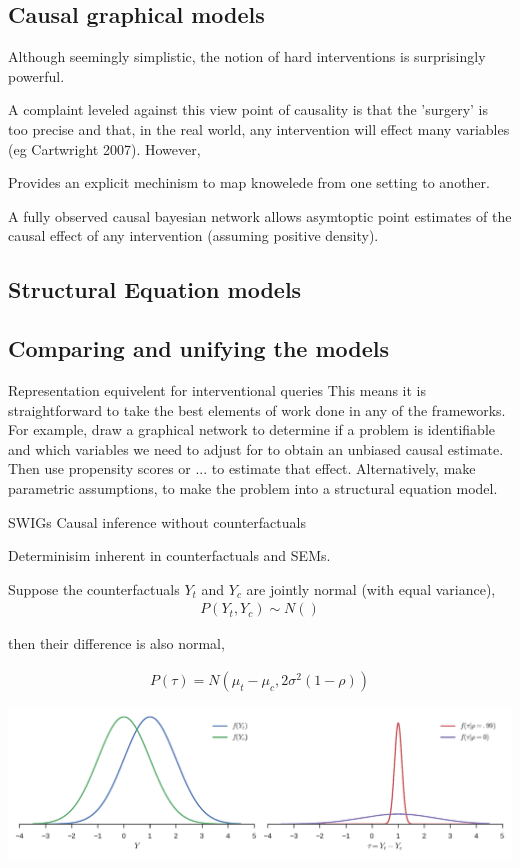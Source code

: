 \documentclass[11pt,a4paper,oneside]{book}
\newcommand{\eq}[1]{\begin{align*}#1\end{align*}}
\begin{document}
\subsection*{Causal graphical models}
Although seemingly simplistic, the notion of hard interventions is surprisingly powerful. 

A complaint leveled against this view point of causality is that the 'surgery' is too precise and that, in the real world, any intervention will effect many variables (eg Cartwright 2007). However, 

Provides an explicit mechinism to map knowelede from one setting to another. 

A fully observed causal bayesian network allows asymtoptic point estimates of the causal effect of any intervention (assuming positive density). 


\subsection*{Structural Equation models}


\subsection*{Comparing and unifying the models}
Representation equivelent for interventional queries
This means it is straightforward to take the best elements of work done in any of the frameworks. For example, draw a graphical network to determine if a problem is identifiable and which variables we need to adjust for to obtain an unbiased causal estimate. Then use propensity scores or ... to estimate that effect. Alternatively, make parametric assumptions, to make the problem into a structural equation model. 

SWIGs \cite{Richardson2013}
\cite{Dawid2000} Causal inference without counterfactuals

Determinisim inherent in counterfactuals and SEMs.


Suppose the counterfactuals $Y_t$ and $Y_c$ are jointly normal (with equal variance),
\eq{
P(Y_t,Y_c) \sim N()
}

then their difference is also normal,

\eq{
P(\tau) = N(\mu_t - \mu_c,2\sigma^{2}(1-\rho))
}

\includegraphics[scale=.6]{figures/counterfactual_nonidentify.pdf}
\end{document}
